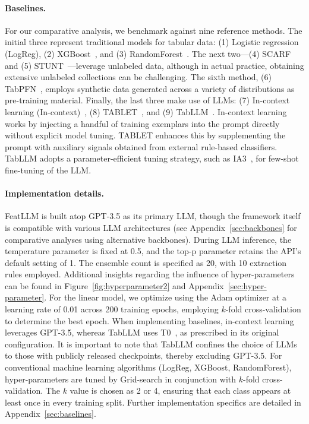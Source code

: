 \vspace*{-0.12in}
\paragraph{Baselines.}
For our comparative analysis, we benchmark against nine reference methods. The initial three represent traditional models for tabular data: (1) Logistic regression (LogReg), (2) XGBoost~\cite{chen2016xgboost}, and (3) RandomForest~\cite{ho1995random}. The next two—(4) SCARF~\cite{bahri2022scarf} and (5) STUNT~\cite{nam2023stunt}—leverage unlabeled data, although in actual practice, obtaining extensive unlabeled collections can be challenging. The sixth method, (6) TabPFN~\cite{hollmann2022tabpfn}, employs synthetic data generated across a variety of distributions as pre-training material. Finally, the last three make use of LLMs: (7) In-context learning (In-context)~\cite{wei2022emergent}, (8) TABLET~\cite{slack2023tablet}, and (9) TabLLM~\cite{hegselmann2023tabllm}. In-context learning works by injecting a handful of training exemplars into the prompt directly without explicit model tuning. TABLET enhances this by supplementing the prompt with auxiliary signals obtained from external rule-based classifiers. TabLLM adopts a parameter-efficient tuning strategy, such as IA3~\cite{liu2022few}, for few-shot fine-tuning of the LLM.

\vspace*{-0.12in}
\paragraph{Implementation details.}
\textsf{FeatLLM} is built atop GPT-3.5 as its primary LLM, though the framework itself is compatible with various LLM architectures (see Appendix~\ref{sec:backbones} for comparative analyses using alternative backbones). During LLM inference, the temperature parameter is fixed at 0.5, and the top-p parameter retains the API’s default setting of 1. The ensemble count is specified as 20, with 10 extraction rules employed. Additional insights regarding the influence of hyper-parameters can be found in Figure~\ref{fig:hyperparameter2} and Appendix~\ref{sec:hyper-parameter}. For the linear model, we optimize using the Adam optimizer at a learning rate of 0.01 across 200 training epochs, employing $k$-fold cross-validation to determine the best epoch. When implementing baselines, in-context learning leverages GPT-3.5, whereas TabLLM uses T0~\cite{sanh2022multitask}, as prescribed in its original configuration. It is important to note that TabLLM confines the choice of LLMs to those with publicly released checkpoints, thereby excluding GPT-3.5. For conventional machine learning algorithms (LogReg, XGBoost, RandomForest), hyper-parameters are tuned by Grid-search in conjunction with $k$-fold cross-validation. The $k$ value is chosen as 2 or 4, ensuring that each class appears at least once in every training split. Further implementation specifics are detailed in Appendix~\ref{sec:baselines}.

